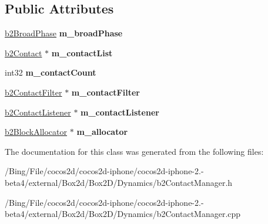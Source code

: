 \subsection*{Public Attributes}
\begin{DoxyCompactItemize}
\item 
\hypertarget{classb2_contact_manager_af85a9c7b0fb138b9fb635dbcf3b0b482}{\hyperlink{classb2_broad_phase}{b2\-Broad\-Phase} {\bfseries m\-\_\-broad\-Phase}}\label{classb2_contact_manager_af85a9c7b0fb138b9fb635dbcf3b0b482}

\item 
\hypertarget{classb2_contact_manager_aaca5f490daffabd29f7ad809921224b3}{\hyperlink{classb2_contact}{b2\-Contact} $\ast$ {\bfseries m\-\_\-contact\-List}}\label{classb2_contact_manager_aaca5f490daffabd29f7ad809921224b3}

\item 
\hypertarget{classb2_contact_manager_a115b2f9bf38ffd045b26ae91ea696288}{int32 {\bfseries m\-\_\-contact\-Count}}\label{classb2_contact_manager_a115b2f9bf38ffd045b26ae91ea696288}

\item 
\hypertarget{classb2_contact_manager_accf0e9232b9eeff002220ecb8d37a17f}{\hyperlink{classb2_contact_filter}{b2\-Contact\-Filter} $\ast$ {\bfseries m\-\_\-contact\-Filter}}\label{classb2_contact_manager_accf0e9232b9eeff002220ecb8d37a17f}

\item 
\hypertarget{classb2_contact_manager_ac3565501f5ab42323050712b244bfe9a}{\hyperlink{classb2_contact_listener}{b2\-Contact\-Listener} $\ast$ {\bfseries m\-\_\-contact\-Listener}}\label{classb2_contact_manager_ac3565501f5ab42323050712b244bfe9a}

\item 
\hypertarget{classb2_contact_manager_a20c57f602aa349239df715de5294821d}{\hyperlink{classb2_block_allocator}{b2\-Block\-Allocator} $\ast$ {\bfseries m\-\_\-allocator}}\label{classb2_contact_manager_a20c57f602aa349239df715de5294821d}

\end{DoxyCompactItemize}


The documentation for this class was generated from the following files\-:\begin{DoxyCompactItemize}
\item 
/\-Bing/\-File/cocos2d/cocos2d-\/iphone/cocos2d-\/iphone-\/2.-\/beta4/external/\-Box2d/\-Box2\-D/\-Dynamics/b2\-Contact\-Manager.\-h\item 
/\-Bing/\-File/cocos2d/cocos2d-\/iphone/cocos2d-\/iphone-\/2.-\/beta4/external/\-Box2d/\-Box2\-D/\-Dynamics/b2\-Contact\-Manager.\-cpp\end{DoxyCompactItemize}
